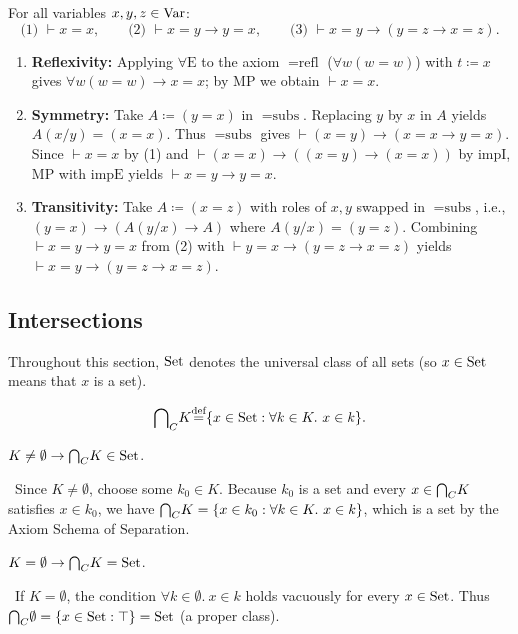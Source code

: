 \documentclass[10pt,a4paper]{article}
\begin{document}
\begin{theorem}
For all variables $x, y, z \in {\textrm{Var}}$:
$$\text{(1) } \vdash x = x, \qquad \text{(2) } \vdash x = y \to y = x, \qquad \text{(3) } \vdash x = y \to (y = z \to x = z).$$
\end{theorem}
\myprf
\begin{enumerate}
\item \textbf{Reflexivity:} Applying $\forall\textrm{E}$ to the axiom $=\textrm{refl}$ ($\forall w(w=w)$) with $t \coloneqq x$ gives $\forall w(w=w) \to x=x$; by $\textrm{MP}$ we obtain $\vdash x = x$.
\item \textbf{Symmetry:} Take $A \coloneqq (y = x)$ in $=\textrm{subs}$. Replacing $y$ by $x$ in $A$ yields $A(x/y) = (x = x)$. Thus $=\textrm{subs}$ gives $\vdash (x = y) \to (x = x \to y = x)$. Since $\vdash x = x$ by (1) and $\vdash (x = x) \to ((x = y) \to (x = x))$ by $\textrm{impI}$, $\textrm{MP}$ with $\textrm{impE}$ yields $\vdash x = y \to y = x$.
\item \textbf{Transitivity:} Take $A \coloneqq (x = z)$ with roles of $x, y$ swapped in $=\textrm{subs}$, i.e., $(y = x) \to (A(y/x) \to A)$ where $A(y/x) = (y = z)$. Combining $\vdash x = y \to y = x$ from (2) with $\vdash y = x \to (y = z \to x = z)$ yields $\vdash x = y \to (y = z \to x = z)$.
\end{enumerate}
\myqed

\subsection{Intersections}
Throughout this section, ${\textrm{Set}}$ denotes the universal class of all sets (so $x \in {\textrm{Set}}$ means that $x$ is a set).

\begin{definition}
$${{\bigcap}_C} K {\stackrel{{\textrm{def}}}{=}} \{x \in {\textrm{Set}} : \forall k\in K.\ x\in k\}.$$
\end{definition}

\begin{exercise}\label{ex:interclass_set}
$K\neq \emptyset \to {{\bigcap}_C} K \in {\textrm{Set}}$.
\end{exercise}
\myprf\ Since $K \neq \emptyset$, choose some $k_0 \in K$. Because $k_0$ is a set and every $x \in {{\bigcap}_C} K$ satisfies $x \in k_0$, we have ${{\bigcap}_C} K = \{x \in k_0 : \forall k\in K.\ x\in k\}$, which is a set by the Axiom Schema of Separation. \myqed

\begin{exercise}
$K=\emptyset \to {{\bigcap}_C} K = {\textrm{Set}}$.
\end{exercise}
\myprf\ If $K = \emptyset$, the condition $\forall k \in \emptyset.\ x \in k$ holds vacuously for every $x \in {\textrm{Set}}$. Thus ${{\bigcap}_C} \emptyset = \{x \in {\textrm{Set}} : \top\} = {\textrm{Set}}$ (a proper class). \myqed
\end{document}
